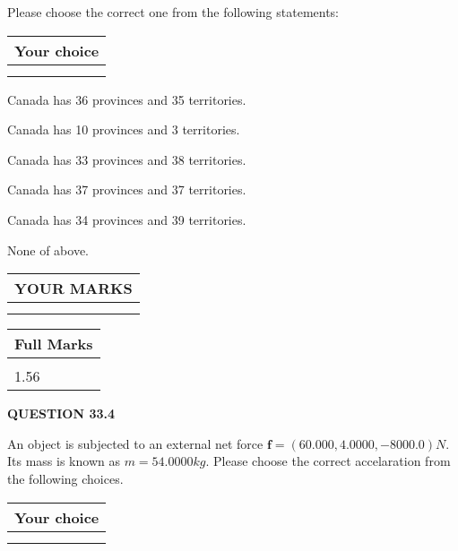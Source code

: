 \documentclass[12pt]{article}
\begin{document}
  
Please choose the correct one from the following statements:
  
  
\noindent\hspace{3.0in} \begin{tabular}{|l|}
\hline
Your choice \\
\hline
 \\ 
 \\ 
\hline
\end{tabular}
  
  
 
 
Canada has  %
36 provinces and  %
35 territories.
 
 
Canada has  %
10 provinces and  %
3 territories.
 
 
Canada has  %
33 provinces and  %
38 territories.
 
 
Canada has  %
37 provinces and  %
37 territories.
 
 
Canada has  %
34 provinces and  %
39 territories.
 
 
 None of above.
 
 
  
\vspace{0.2in}
  
\noindent\begin{tabular}{|l|}
\hline
 YOUR MARKS  \\
\hline
 \\ 
 \\ 
\hline
\end{tabular}
\hspace{0.05in} \begin{tabular}{|l|}
\hline
 Full Marks  \\
\hline
 \\ 
1.56 \\
\hline
\end{tabular}
{\textbf{\Large{QUESTION
33.4 
}}}
  
  
 
An object is subjected to an external net force $\mathbf{f}=(
60.000 ,
4.0000,
-8000.0  )N$. Its mass is known as
$m= %
54.0000  kg$. Please choose the correct accelaration
from the following choices.
 
  
  
\noindent\hspace{3.0in} \begin{tabular}{|l|}
\hline
Your choice \\
\hline
 \\ 
 \\ 
\hline
\end{tabular}
  
\end{document}
